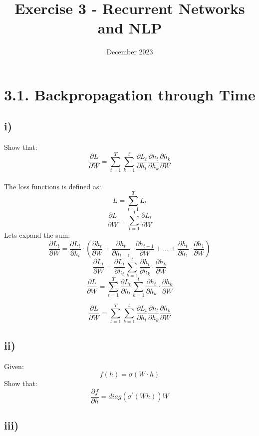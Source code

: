 

\title{Exercise 3 - Recurrent Networks and NLP}
\date{December 2023}



\maketitle
\section*{3.1. Backpropagation through Time}
\subsection*{i)}
Show that: 
\[\frac{\partial L}{\partial W} = \sum_{t=1}^{T} 
\sum_{k=1}^{t} 
\frac{\partial L_t}{\partial h_t} 
\frac{\partial h_t}{\partial h_k} 
\frac{\partial h_k}{\partial W} \]\\
The loss functions is defined as:
\[L=\sum_{t=1}^{T} L_t\]
\[\frac{\partial L}{\partial W} = \sum_{t=1}^{T}\frac{\partial L_t}{\partial W}\]
Lets expand the sum:
\[ \frac{\partial L_t}{\partial W} =
  \frac{\partial L_t}{\partial h_t} \cdot (\frac{\partial h_t}{\partial W} +
  \frac{\partial h_t}{\partial h_{t-1}} \cdot \frac{\partial h_{t-1}}{\partial W} + . . . +
  \frac{\partial h_t}{\partial h_1} \cdot \frac{\partial h_1}{\partial W})\]
\[ \frac{\partial L_t}{\partial W} = \frac{\partial L_t}{\partial h_t} \sum_{k=1}^{t} \frac{\partial h_t}{\partial h_k} \cdot \frac{\partial h_k}{\partial W}\]
\[\frac{\partial L}{\partial W} = \sum_{t=1}^{T}\frac{\partial L_t}{\partial h_t} \sum_{k=1}^{t} \frac{\partial h_t}{\partial h_k} \cdot \frac{\partial h_k}{\partial W}\]

\[\frac{\partial L}{\partial W} = \sum_{t=1}^{T} 
\sum_{k=1}^{t} 
\frac{\partial L_t}{\partial h_t} 
\frac{\partial h_t}{\partial h_k} 
\frac{\partial h_k}{\partial W} \]
\subsection*{ii)}
Given:
\[f(h) = \sigma(W \cdot h)\]
Show that:
\[\frac{\partial f}{\partial h} = diag(\sigma^{\prime}(Wh))W\]
\subsection*{iii)}


